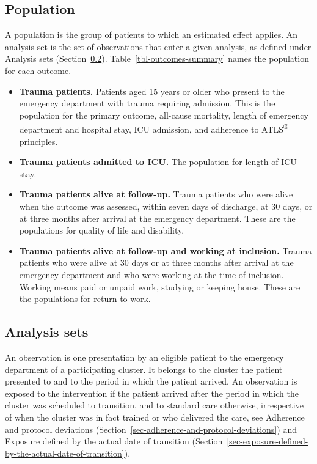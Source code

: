 \documentclass[
]{scrartcl}
\providecommand{\tightlist}{%
  \setlength{\itemsep}{0pt}\setlength{\parskip}{0pt}}\usepackage{longtable,booktabs,array}
\begin{document}
\subsection{Population}\label{sec-population}

A population is the group of patients to which an estimated effect
applies. An analysis set is the set of observations that enter a given
analysis, as defined under Analysis sets
(Section~\ref{sec-analysis-sets}). Table~\ref{tbl-outcomes-summary}
names the population for each outcome.

\begin{itemize}
\tightlist
\item
  \textbf{Trauma patients.} Patients aged 15 years or older who present
  to the emergency department with trauma requiring admission. This is
  the population for the primary outcome, all-cause mortality, length of
  emergency department and hospital stay, ICU admission, and adherence
  to ATLS\textsuperscript{®} principles.
\item
  \textbf{Trauma patients admitted to ICU.} The population for length of
  ICU stay.
\item
  \textbf{Trauma patients alive at follow-up.} Trauma patients who were
  alive when the outcome was assessed, within seven days of discharge,
  at 30 days, or at three months after arrival at the emergency
  department. These are the populations for quality of life and
  disability.
\item
  \textbf{Trauma patients alive at follow-up and working at inclusion.}
  Trauma patients who were alive at 30 days or at three months after
  arrival at the emergency department and who were working at the time
  of inclusion. Working means paid or unpaid work, studying or keeping
  house. These are the populations for return to work.
\end{itemize}

\subsection{Analysis sets}\label{sec-analysis-sets}

An observation is one presentation by an eligible patient to the
emergency department of a participating cluster. It belongs to the
cluster the patient presented to and to the period in which the patient
arrived. An observation is exposed to the intervention if the patient
arrived after the period in which the cluster was scheduled to
transition, and to standard care otherwise, irrespective of when the
cluster was in fact trained or who delivered the care, see
Adherence and protocol deviations
(Section~\ref{sec-adherence-and-protocol-deviations}) and
Exposure defined by the actual date of transition
(Section~\ref{sec-exposure-defined-by-the-actual-date-of-transition}).
\end{document}
